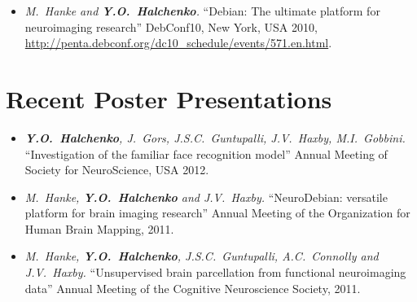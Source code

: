 \documentclass[12pt,overlapped,line]{res}
\newcommand{\mtitle}[1]{``#1''}
\newcommand{\mauthors}[1]{ \textit{#1.}}
\newcommand{\mwhere}[1]{#1.}
\begin{document}
\begin{resume}
\begin{itemize}
 \item
   \mauthors{M.~Hanke and \textbf{Y.O.~Halchenko}}
   \mtitle{Debian: The ultimate platform for neuroimaging
     research}
   \mwhere{DebConf10, New York, USA 2010,
     \url{http://penta.debconf.org/dc10_schedule/events/571.en.html}}


%
%
%
%
 \end{itemize}

\section{Recent Poster Presentations }

\begin{itemize}
 \item
   \mauthors{\textbf{Y.O.~Halchenko}, J.~Gors, J.S.C.~Guntupalli,
     J.V.~Haxby, M.I.~Gobbini}
   \mtitle{Investigation of the familiar face recognition model}
   \mwhere{Annual Meeting of Society for NeuroScience, USA 2012}

 \item
   \mauthors{M.~Hanke, \textbf{Y.O.~Halchenko} and J.V.~Haxby}
   \mtitle{NeuroDebian: versatile platform for brain imaging research}
   \mwhere{Annual Meeting of the Organization for Human Brain Mapping, 2011}

 \item
   \mauthors{M.~Hanke, \textbf{Y.O.~Halchenko}, J.S.C.~Guntupalli,
     A.C.~Connolly and J.V.~Haxby}
   \mtitle{Unsupervised brain parcellation from functional neuroimaging data}
   \mwhere{Annual Meeting of the Cognitive Neuroscience Society, 2011}


\end{itemize}
\end{resume}
\end{document}
